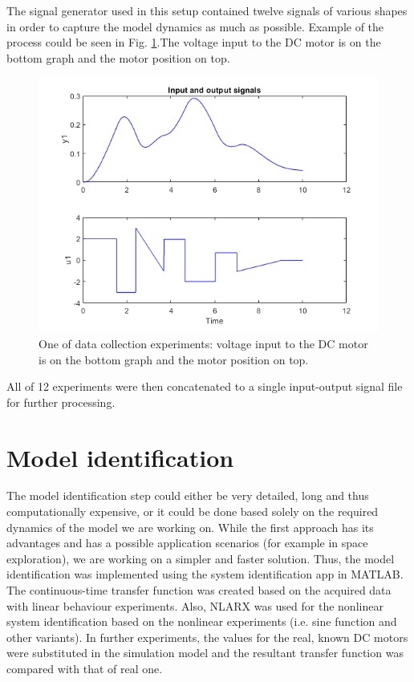 \documentclass[]{final_report}
\begin{document}
The signal generator used in this setup contained twelve signals of various shapes in order to capture the model dynamics as much as possible. Example of the process could be seen in Fig. \ref{fig:dataexp}.The voltage input to the DC motor is on the bottom graph and the motor position on top.

\begin{figure} [h!]
\centerline{\includegraphics[width=.75\textwidth]{Screenshots for paper/matlab models/training_dataset_simulation.png}}
\caption{One of data collection experiments: voltage input to the DC motor is on the bottom graph and the motor position on top.}
\label{fig:dataexp}
\end{figure}

All of 12 experiments were then concatenated to a single input-output signal file for further processing.

\section{Model identification}
The model identification step could either be very detailed, long and thus computationally expensive, or it could be done based solely on the required dynamics of the model we are working on. While the first approach has its advantages and has a possible application scenarios (for example in space exploration), we are working on a simpler and faster solution. Thus, the model identification was implemented using the system identification app in MATLAB. The continuous-time transfer function was created based on the acquired data with linear behaviour experiments. Also, NLARX was used for the nonlinear system identification based on the nonlinear experiments (i.e. sine function and other variants). In further experiments, the values for the real, known DC motors were substituted in the simulation model and the resultant transfer function was compared with that of real one.
\end{document}
